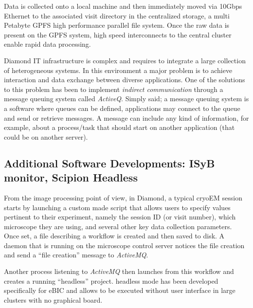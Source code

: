 Data is collected onto a local machine %
and then immediately moved via 10Gbps Ethernet to the associated visit directory in the centralized storage, a multi Petabyte GPFS high performance parallel file system.  Once the raw data is present on the GPFS system, high speed interconnects to the central cluster enable rapid data processing. %

Diamond IT infrastructure is complex and requires to integrate a large collection of heterogeneous systems. In this environment a major problem is to achieve interaction and data exchange between diverse applications. One of the solutions to this problem has been to implement \emph{indirect communication} through a message queuing system called \emph{ActiveQ}. Simply said; a message queuing system is a software where queues can be defined, applications may connect to the queue and send or retrieve  messages. A message can include any kind of information, for example, about a process/task that should start on another application (that could be on another server). %

\subsection{Additional Software Developments: ISyB monitor, Scipion Headless}

From the image processing point of view, in Diamond, a typical cryoEM session starts by launching a custom made script that  allows users to specify values pertinent to their experiment, namely the session ID (or visit number), which microscope they are using, and several other key data collection parameters. Once set, a file describing a \scipion workflow is created and then saved to disk.
A daemon that is running on the microscope control server notices the file creation and send a ``file creation'' message to \emph{ActiveMQ}. 

Another process listening to \emph{ActiveMQ} then launches \scipion from this workflow and creates a running ``headless'' project. \scipion headless mode has been developed specifically for eBIC and allows \scipion to be executed without user interface in large clusters with no graphical board. 

